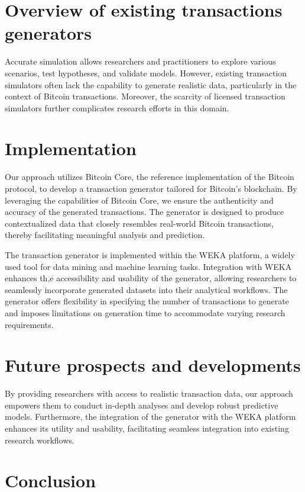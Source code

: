 \documentclass[conference]{IEEEtran}
\begin{document}
\section{Overview of existing transactions generators}

Accurate simulation allows researchers and practitioners to explore various scenarios, test hypotheses, and validate models. However, existing transaction simulators often lack the capability to generate realistic data, particularly in the context of Bitcoin transactions. Moreover, the scarcity of licensed transaction simulators further complicates research efforts in this domain.

\section{Implementation}

Our approach utilizes Bitcoin Core, the reference implementation of the Bitcoin protocol, to develop a transaction generator tailored for Bitcoin's blockchain. By leveraging the capabilities of Bitcoin Core, we ensure the authenticity and accuracy of the generated transactions. The generator is designed to produce contextualized data that closely resembles real-world Bitcoin transactions, thereby facilitating meaningful analysis and prediction.

The transaction generator is implemented within the WEKA platform, a widely used tool for data mining and machine learning tasks. Integration with WEKA enhances th,e accessibility and usability of the generator, allowing researchers to seamlessly incorporate generated datasets into their analytical workflows. The generator offers flexibility in specifying the number of transactions to generate and imposes limitations on generation time to accommodate varying research requirements.

\section{Future prospects and developments}

 By providing researchers with access to realistic transaction data, our approach empowers them to conduct in-depth analyses and develop robust predictive models. Furthermore, the integration of the generator with the WEKA platform enhances its utility and usability, facilitating seamless integration into existing research workflows.

\section{Conclusion}
\end{document}
